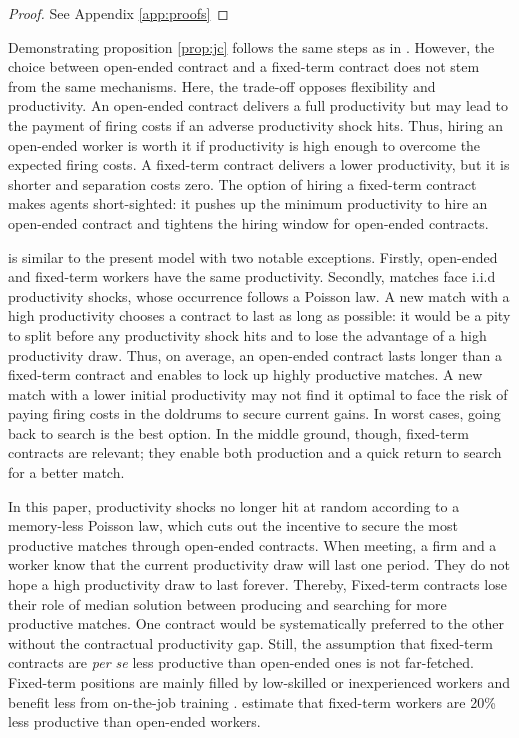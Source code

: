 \begin{proof}
See Appendix \ref{app:proofs}
\end{proof}

Demonstrating proposition \ref{prop:jc} follows the same steps as in \citet{rion:halshs-02331887}. However, the choice between open-ended contract and a fixed-term contract does not stem from the same mechanisms. Here, the trade-off opposes flexibility and productivity. An open-ended contract delivers a full productivity but may lead to the payment of firing costs if an adverse productivity shock hits. Thus, hiring an open-ended worker is worth it if productivity is high enough to overcome the expected firing costs. A fixed-term contract delivers a lower productivity, but it is shorter and separation costs zero. The option of hiring a fixed-term contract makes agents short-sighted: it pushes up the minimum productivity to hire an open-ended contract and tightens the hiring window for open-ended contracts.  

\citet{rion:halshs-02331887} is similar to the present model with two notable exceptions. Firstly, open-ended and fixed-term workers have the same productivity. Secondly, matches face i.i.d productivity shocks, whose occurrence follows a Poisson law. A new match with a high productivity chooses a contract to last as long as possible: it would be a pity to split before any productivity shock hits and to lose the advantage of a high productivity draw. Thus, on average, an open-ended contract lasts longer than a fixed-term contract and enables to lock up highly productive matches. A new match with a lower initial productivity may not find it optimal to face the risk of paying firing costs in the doldrums to secure current gains. In worst cases, going back to search is the best option. In the middle ground, though, fixed-term contracts are relevant; they enable both production and a quick return to search for a better match.

In this paper, productivity shocks no longer hit at random according to a memory-less Poisson law, which cuts out the incentive to secure the most productive matches through open-ended contracts.  When meeting, a firm and a worker know that the current productivity draw will last one period. They do not hope a high productivity draw to last forever. Thereby, Fixed-term contracts lose their role of median solution between producing and searching for more productive matches. One contract would be systematically preferred to the other without the contractual productivity gap. Still, the assumption that fixed-term contracts are \emph{per se} less productive than open-ended ones is not far-fetched. Fixed-term positions are mainly filled by low-skilled or inexperienced workers \citep{fontaine2016cdd} and benefit less from on-the-job training \citep{doi:10.1111/1467-8543.00106,10.1162/154247604323068041,Albert2005,10.1093/esr/jcs011}. \citet{doi:10.1111/ecin.12077} estimate that fixed-term workers are 20\% less productive than open-ended workers.

